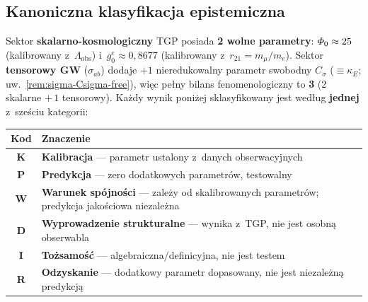 %
%

\subsection*{Kanoniczna klasyfikacja epistemiczna}
\label{ssec:epistemic-table}

\noindent
Sektor \textbf{skalarno-kosmologiczny} TGP posiada \textbf{2 wolne parametry}:
$\varPhi_0 \approx 25$ (kalibrowany z~$\Lambda_{\mathrm{obs}}$)
i~$g_0^e \approx 0{,}8677$ (kalibrowany z~$r_{21} = m_\mu/m_e$).
Sektor \textbf{tensorowy GW} ($\sigma_{ab}$) dodaje $+1$ nieredukowalny parametr swobodny
$C_\sigma$ ($\equiv\kappa_E$; uw.~\ref{rem:sigma-Csigma-free}), wi\k{e}c pe\l{}ny bilans
fenomenologiczny to \textbf{3} ($2$ skalarne $+\,1$ tensorowy).
Ka\.zdy wynik poni\.zej sklasyfikowany jest wed\l{}ug
\textbf{jednej} z~sze\'sciu kategorii:

\smallskip
\begin{center}\footnotesize
\begin{tabular}{@{}cl@{}}
\toprule
\textbf{Kod} & \textbf{Znaczenie} \\
\midrule
\textbf{K} & \textbf{Kalibracja} --- parametr ustalony z~danych obserwacyjnych \\
\textbf{P} & \textbf{Predykcja} --- zero dodatkowych parametr\'ow, testowalny \\
\textbf{W} & \textbf{Warunek sp\'ojno\'sci} --- zale\.zy od skalibrowanych parametr\'ow;
              predykcja jako\'sciowa niezale\.zna \\
\textbf{D} & \textbf{Wyprowadzenie strukturalne} --- wynika z~TGP, nie jest osobn\k{a} obserwabla \\
\textbf{I} & \textbf{To\.zsamo\'s\'c} --- algebraiczna/definicyjna, nie jest testem \\
\textbf{R} & \textbf{Odzyskanie} --- dodatkowy parametr dopasowany, nie jest niezale\.zn\k{a} predykcj\k{a} \\
\bottomrule
\end{tabular}
\end{center}

